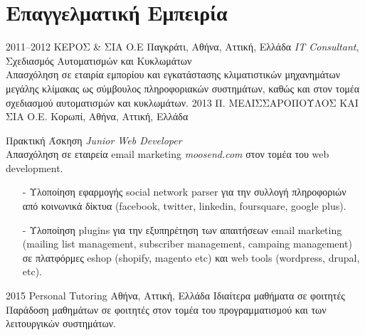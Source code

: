 \documentclass[print]{keros-cv} %
\begin{document}
\section{Επαγγελματική Εμπειρία}

\begin{entrylist}
\entry
{2011--2012}
{ΚΕΡΟΣ \& ΣΙΑ Ο.Ε}
{Παγκράτι, Αθήνα, Αττική, Ελλάδα}
{\emph{IT Consultant}, Σχεδιασμός Αυτοματισμών και Κυκλωμάτων\\
Απασχόληση σε εταιρία εμπορίου και εγκατάστασης κλιματιστικών μηχανημάτων μεγάλης κλίμακας ως σύμβουλος πληροφοριακών συστημάτων, καθώς και στον τομέα σχεδιασμού αυτοματισμών και κυκλωμάτων.}
\entry
{2013}
{Π. ΜΕΛΙΣΣΑΡΟΠΟΥΛΟΣ ΚΑΙ ΣΙΑ Ο.Ε.}
{Κορωπί, Αθήνα, Αττική, Ελλάδα}
{Πρακτική Άσκηση \emph{Junior Web Developer} \\
Απασχόληση σε εταιρεία email marketing \emph{moosend.com} στον τομέα
του web development.
\begin{itemize}
\item[-] Υλοποίηση εφαρμογής social network parser για την συλλογή πληροφοριών από
κοινωνικά δίκτυα (facebook, twitter, linkedin, foursquare, google plus).
\item[-] Υλοποίηση plugins για την εξυπηρέτηση των απαιτήσεων email marketing (mailing list management, subscriber management, campaing management) σε πλατφόρμες eshop (shopify, magento etc) και web tools (wordpress, drupal, etc).
\end{itemize}}
\entry
{2015}
{Personal Tutoring}
{Αθήνα, Αττική, Ελλάδα}
{ Ιδιαίτερα μαθήματα σε φοιτητές\\
Παράδοση μαθημάτων σε φοιτητές στον τομέα του προγραμματισμού και των λειτουργικών συστημάτων.} 
\end{entrylist}


\end{document}
